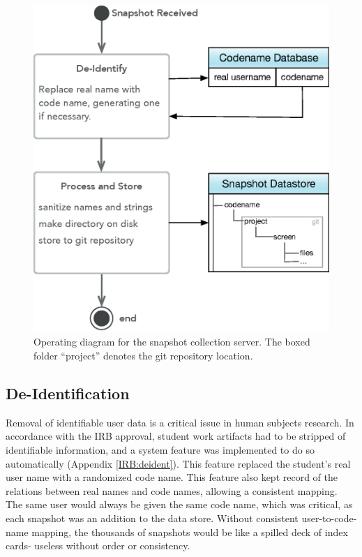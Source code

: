 \begin{figure}
  \centering
      \includegraphics[width=\textwidth]{diagrams/server-operation}
  \caption[Server operating diagram]{Operating diagram for the snapshot collection server. The boxed folder ``project'' denotes the git repository location.}
  \label{fig:server-process}
\end{figure}


\subsection{De-Identification}
\label{sec:deident}
Removal of identifiable user data is a critical issue in human subjects research. In accordance with the IRB approval, student work artifacts had to be stripped of identifiable information, and a system feature was implemented to do so automatically (Appendix \ref{IRB:deident}). This feature replaced the student's real user name with a randomized code name. This feature also kept record of the relations between real names and code names, allowing a consistent mapping. The same user would always be given the same code name, which was critical, as each snapshot was an addition to the data store. Without consistent user-to-code-name mapping, the thousands of snapshots would be like a spilled deck of index cards- useless without order or consistency. 

